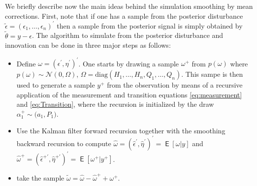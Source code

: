 \documentclass{article}
\DeclareMathOperator{\E}{\mathsf{E}}
\begin{document}
We briefly describe now the main ideas behind the simulation smoothing by mean
corrections. First, note that if one has a sample from the posterior disturbance
$\tilde{\epsilon} =(\epsilon_1,\dots,\epsilon_n)^\prime$ then a sample from the posterior
signal is simply obtained by $\tilde{\theta} = y - \epsilon $. The algorithm to simulate from
the posterior disturbance and innovation can be done in three major steps as follows:
\begin{itemize}
\item Define $\omega =(\epsilon^\prime,\eta^\prime)^\prime$. One starts by drawing a sample
  $\omega^+$ from $p(\omega)$ where $p(\omega) \sim \mathcal{N}(0,\Omega)$,
  $\Omega=\text{diag}(H_1,\dots,H_n,Q_1,\dots,Q_n).$ This sampe is then used to generate a
  sample $y^+$ from the observation by means of a recursive application of the measurement
  and transition equations \eqref{eq:measurement} and \eqref{eq:Transition}, where the
  recursion is initialized by the draw $\alpha_1^+ \sim \mathcal (a_1,P_1)$.

\item Use the Kalman filter forward recursion together with the smoothing backward recursion
  to compute $\hat{\omega}=(\hat{\epsilon}^\prime,\hat{\eta}^\prime)^\prime =\E[\omega|y]$
  and
  $\hat{\omega}^+=(\hat{\epsilon}^{+\prime},\hat{\eta}^{+\prime})^\prime =\E[\omega^+|y^+]$.

\item take the sample $\tilde{\omega}=\hat{\omega}-\hat{\omega}^+ + \omega^+$.

\end{itemize}
\end{document}
